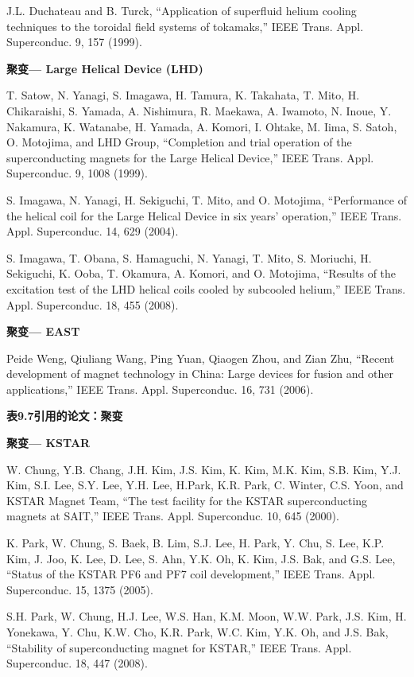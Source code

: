 \noindent [9.31] J.L. Duchateau and B. Turck, ``Application of superfluid helium cooling techniques
to the toroidal field systems of tokamaks,” IEEE Trans. Appl. Superconduc. 9, 157
(1999).

\noindent \textbf{聚变--- Large Helical Device (LHD) }

\noindent [9.32] T. Satow, N. Yanagi, S. Imagawa, H. Tamura, K. Takahata, T. Mito, H. Chikaraishi,
S. Yamada, A. Nishimura, R. Maekawa, A. Iwamoto, N. Inoue, Y. Nakamura,
K. Watanabe, H. Yamada, A. Komori, I. Ohtake, M. Iima, S. Satoh, O. Motojima,
and LHD Group, ``Completion and trial operation of the superconducting magnets
for the Large Helical Device,” IEEE Trans. Appl. Superconduc. 9, 1008 (1999).

\noindent [9.33] S. Imagawa, N. Yanagi, H. Sekiguchi, T. Mito, and O. Motojima, ``Performance of
the helical coil for the Large Helical Device in six years’ operation,” IEEE Trans.
Appl. Superconduc. 14, 629 (2004).

\noindent [9.34] S. Imagawa, T. Obana, S. Hamaguchi, N. Yanagi, T. Mito, S. Moriuchi, H. Sekiguchi,
K. Ooba, T. Okamura, A. Komori, and O. Motojima, ``Results of the excitation
test of the LHD helical coils cooled by subcooled helium,” IEEE Trans.
Appl. Superconduc. 18, 455 (2008).

\noindent \textbf{聚变--- EAST}

\noindent [9.35] Peide Weng, Qiuliang Wang, Ping Yuan, Qiaogen Zhou, and Zian Zhu, ``Recent development of magnet technology in China: Large devices for fusion and other applications,” IEEE Trans. Appl. Superconduc. 16, 731 (2006).

\noindent \textbf{表9.7引用的论文：聚变}

\noindent \textbf{聚变--- KSTAR }

\noindent [9.36] W. Chung, Y.B. Chang, J.H. Kim, J.S. Kim, K. Kim, M.K. Kim, S.B. Kim,
Y.J. Kim, S.I. Lee, S.Y. Lee, Y.H. Lee, H.Park, K.R. Park, C. Winter, C.S. Yoon,
and KSTAR Magnet Team, ``The test facility for the KSTAR superconducting
magnets at SAIT,” IEEE Trans. Appl. Superconduc. 10, 645 (2000).

\noindent [9.37] K. Park, W. Chung, S. Baek, B. Lim, S.J. Lee, H. Park, Y. Chu, S. Lee, K.P. Kim,
J. Joo, K. Lee, D. Lee, S. Ahn, Y.K. Oh, K. Kim, J.S. Bak, and G.S. Lee, ``Status
of the KSTAR PF6 and PF7 coil development,” IEEE Trans. Appl. Superconduc.
15, 1375 (2005).

\noindent [9.38] S.H. Park, W. Chung, H.J. Lee, W.S. Han, K.M. Moon, W.W. Park, J.S. Kim,
H. Yonekawa, Y. Chu, K.W. Cho, K.R. Park, W.C. Kim, Y.K. Oh, and J.S. Bak,
``Stability of superconducting magnet for KSTAR,” IEEE Trans. Appl. Superconduc.
18, 447 (2008).

